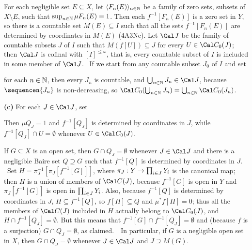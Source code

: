 {For each negligible set $E\subseteq X$, let
$\langle F_n(E)\rangle_{n\in\Bbb N}$ be a family of zero sets, subsets
of $X\setminus E$, such that $\sup_{n\in\Bbb N}\mu F_n(E)=1$.   Then each
$f^{-1}[F_n(E)]$ is a zero set in $Y$, so there is a countable set
$M(E)\subseteq I$ such that all the sets $f^{-1}[F_n(E)]$ are determined
by coordinates in $M(E)$ (4A3Nc).   Let $\Cal J$ be the family of
countable subsets $J$ of
$I$ such that $M(f[U])\subseteq J$ for every $U\in\Cal C_0(J)$;  then
$\Cal J$ is cofinal with $[I]^{\le\omega}$, that is, every countable
subset of $I$ is included in some member of $\Cal J$.   \Prf\ If we
start from any countable subset $J_0$ of $I$ and set


\noindent for each $n\in\Bbb N$, then every $J_n$ is countable, and
$\bigcup_{n\in\Bbb N}J_n\in\Cal
J$, because $\sequencen{J_n}$ is non-decreasing, so $\Cal
C_0(\bigcup_{n\in\Bbb N}J_n)=\bigcup_{n\in\Bbb N}\Cal C_0(J_n)$.\ \Qed

\medskip

{\bf (c)} For each $J\in\Cal J$, set


\noindent Then $\mu Q_J=1$ and $f^{-1}[Q_J]$ is determined by
coordinates
in $J$, while $f^{-1}[Q_J]\cap U=\emptyset$ whenever $U\in\Cal C_0(J)$.

If $G\subseteq X$ is an open set, then $G\cap Q_J=\emptyset$
whenever $J\in\Cal J$ and there is a negligible Baire set $Q\supseteq G$
such that $f^{-1}[Q]$ is determined by coordinates in $J$.   \Prf\  Set
$H=\pi_J^{-1}[\pi_J[f^{-1}[G]]]$, where $\pi_J:Y\to\prod_{i\in J}Y_i$ is the
canonical map;  then $H$ is a union of members of $\Cal C(J)$, because
$f^{-1}[G]$ is open in $Y$ and $\pi_J[f^{-1}[G]]$ is open in
$\prod_{i\in J}Y_i$.   Also, because $f^{-1}[Q]$ is determined by coordinates in
$J$, $H\subseteq f^{-1}[Q]$, so $f[H]\subseteq Q$ and $\mu^*f[H]=0$;
thus all the members of $\Cal C(J)$ included in $H$ actually belong to
$\Cal C_0(J)$, and $H\cap f^{-1}[Q_J]=\emptyset$.
But this means that $f^{-1}[G]\cap f^{-1}[Q_J]=\emptyset$ and (because
$f$ is a surjection) $G\cap Q_J=\emptyset$, as
claimed.\ \QeD\   In particular, if $G$ is a negligible open set in $X$,
then $G\cap
Q_J=\emptyset$ whenever $J\in\Cal J$ and $J\supseteq M(G)$.

\medskip

}
